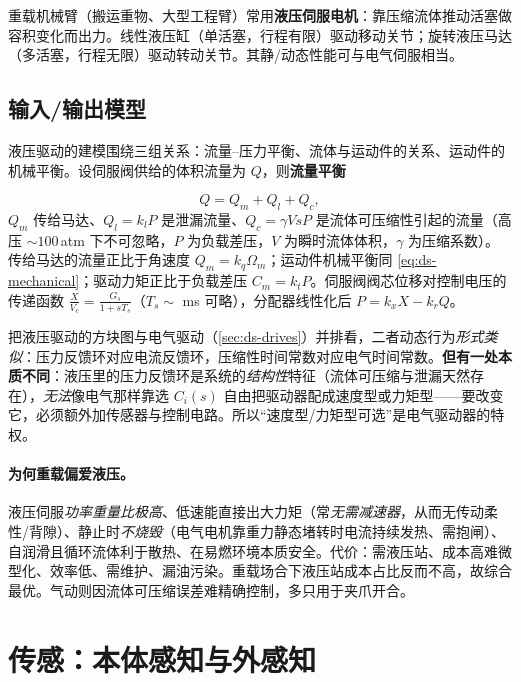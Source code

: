 重载机械臂（搬运重物、大型工程臂）常用\textbf{液压伺服电机}：靠压缩流体推动活塞做容积变化而出力。线性液压缸（单活塞，行程有限）驱动移动关节；旋转液压马达（多活塞，行程无限）驱动转动关节。其静/动态性能可与电气伺服相当。

\subsection{输入/输出模型}
\label{sec:ds-hyd-model}

液压驱动的建模围绕三组关系：流量--压力平衡、流体与运动件的关系、运动件的机械平衡。设伺服阀供给的体积流量为 $Q$，则\textbf{流量平衡}

\begin{equation}
Q = Q_m + Q_l + Q_c,
\label{eq:ds-hyd-flow}
\end{equation}
$Q_m$ 传给马达、$Q_l=k_l P$ 是泄漏流量、$Q_c=\gamma V s P$ 是流体可压缩性引起的流量（高压 $\sim100\,$atm 下不可忽略，$P$ 为负载差压，$V$ 为瞬时流体体积，$\gamma$ 为压缩系数）。传给马达的流量正比于角速度 $Q_m=k_q\Omega_m$；运动件机械平衡同 \cref{eq:ds-mechanical}；驱动力矩正比于负载差压 $C_m=k_t P$。伺服阀阀芯位移对控制电压的传递函数 $\frac{X}{V_c}=\frac{G_s}{1+sT_s}$（$T_s\sim$ ms 可略），分配器线性化后 $P=k_x X-k_r Q$。

\begin{insight}
\label{ins:ds-hyd-analogy}
把液压驱动的方块图与电气驱动（\cref{sec:ds-drives}）并排看，二者动态行为\emph{形式类似}：压力反馈环对应电流反馈环，压缩性时间常数对应电气时间常数。\textbf{但有一处本质不同}：液压里的压力反馈环是系统的\emph{结构性}特征（流体可压缩与泄漏天然存在），\emph{无法}像电气那样靠选 $C_i(s)$ 自由把驱动器配成速度型或力矩型——要改变它，必须额外加传感器与控制电路。所以“速度型/力矩型可选”是电气驱动器的特权。
\end{insight}

\paragraph{为何重载偏爱液压。}\;液压伺服\emph{功率重量比极高}、低速能直接出大力矩（常\emph{无需减速器}，从而无传动柔性/背隙）、静止时\emph{不烧毁}（电气电机靠重力静态堵转时电流持续发热、需抱闸）、自润滑且循环流体利于散热、在易燃环境本质安全。代价：需液压站、成本高难微型化、效率低、需维护、漏油污染。重载场合下液压站成本占比反而不高，故综合最优。气动则因流体可压缩误差难精确控制，多只用于夹爪开合。

\section{传感：本体感知与外感知}
\label{sec:ds-sensors}

